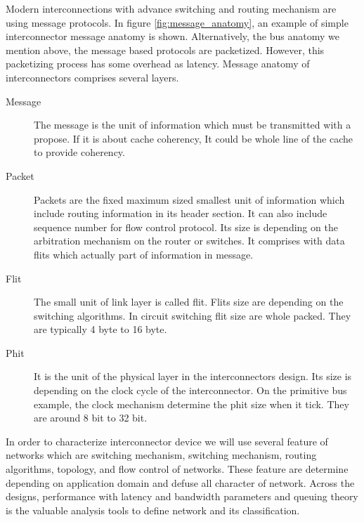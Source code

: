            Modern interconnections with advance switching and routing mechanism are using message protocols.  In figure \ref{fig:message_anatomy}, an example of simple interconnector message anatomy is shown. Alternatively, the bus anatomy we mention above, the message based protocols are packetized. However, this packetizing process has some overhead as latency\cite{ComputerArchCoursera}. Message anatomy of interconnectors comprises several layers\cite{0122007514}.
            \begin{description}
                \item[Message]The message is the unit of information which must be transmitted with a propose. If it is about cache coherency, It could be whole line of the cache to provide coherency.
                \item[Packet]Packets are the fixed maximum sized  smallest unit of information which include routing information in its header section. It can also include sequence number for flow control protocol. Its size is depending on the arbitration mechanism on the router or switches. It comprises with data flits which actually part of information in message.
                \item[Flit]The small unit of link layer is called flit. Flits size are depending on the switching algorithms. In circuit switching flit size are whole packed. They are typically 4 byte to 16 byte.
                \item[Phit]It is the unit of the physical layer in the interconnectors design. Its size is depending on the clock cycle of the interconnector. On the primitive bus example, the clock mechanism determine the phit size when it tick. They are around 8 bit to 32 bit.
            \end{description}
            In order to characterize interconnector device we will use several feature of networks which are switching mechanism, switching mechanism, routing algorithms, topology, and flow control of networks. These feature are determine depending on application domain and defuse all character of network. Across the designs, performance with latency and bandwidth parameters and queuing theory is the valuable analysis tools to define network and its classification\cite{hennessy2012computer}.
